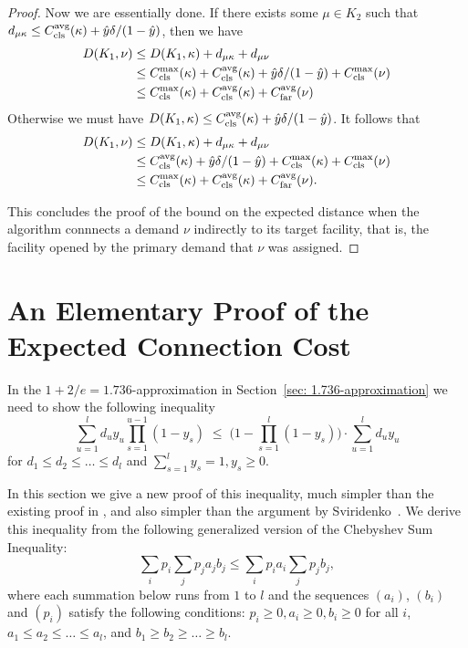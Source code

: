 \documentclass[11pt]{article}
\begin{document}
\begin{proof}
  Now we are essentially done. If there exists some $\mu \in K_2$ such
  that $d_{\mu\kappa} \leq C_{\text{cls}}^{{\mbox{\scriptsize\rm avg}}}(\kappa) +
  \hat{y}\delta/(1-\hat{y})$, then we have
  \begin{align*}
    D(K_1, \nu) &\leq D(K_1, \kappa) + d_{\mu\kappa} + d_{\mu\nu} \\
    &\leq C_{\text{cls}}^{\max}(\kappa) + C_{\text{cls}}^{{\mbox{\scriptsize\rm avg}}}(\kappa) +
    \hat{y}\delta/(1-\hat{y})
    + C_{\text{cls}}^{\max}(\nu)\\
    &\leq C_{\text{cls}}^{\max}(\kappa) + C_{\text{cls}}^{{\mbox{\scriptsize\rm avg}}}(\kappa) + C_{\text{far}}^{{\mbox{\scriptsize\rm avg}}}(\nu)
  \end{align*}
  Otherwise we must have $D(K_1, \kappa) \leq C_{\text{cls}}^{{\mbox{\scriptsize\rm avg}}}(\kappa) +
  \hat{y}\delta/(1-\hat{y})$. It follows that
  \begin{align*}
    D(K_1, \nu) &\leq D(K_1, \kappa) + d_{\mu\kappa} + d_{\mu\nu} \\
    &\leq C_{\text{cls}}^{{\mbox{\scriptsize\rm avg}}}(\kappa) + \hat{y}\delta/(1-\hat{y}) +
    C_{\text{cls}}^{\max}(\kappa)
    + C_{\text{cls}}^{\max}(\nu)\\
    &\leq C_{\text{cls}}^{\max}(\kappa) + C_{\text{cls}}^{{\mbox{\scriptsize\rm avg}}}(\kappa) + C_{\text{far}}^{{\mbox{\scriptsize\rm avg}}}(\nu).
  \end{align*}

  This concludes the proof of the bound on the expected distance when
  the algorithm connnects a demand $\nu$ indirectly to its target
  facility, that is, the facility opened by the primary demand that
  $\nu$ was assigned.
\end{proof}

\section{An Elementary Proof of the Expected Connection Cost}
In the $1+2/e=1.736$-approximation in Section~\ref{sec: 1.736-approximation}
we need to show the following inequality
%
\begin{equation}
  \label{eq:dist}
\sum_{u=1}^l d_uy_u\prod_{s=1}^{u-1}(1-y_s)
  \;\leq\;  \Big(1 - \prod_{s=1}^l (1-y_s)\Big) \cdot \sum_{u=1}^l d_u y_u
\end{equation}
%
for $d_1\leq d_2 \leq \ldots \leq d_l$ and $\sum_{s=1}^l y_s = 1, y_s \geq 0$.

In this section we give a new proof of this inequality, much
simpler than the existing proof in \cite{ChudakS04}, and also simpler than
the argument by Sviridenko~\cite{Svi02}.  
We derive this inequality from the following generalized version of the Chebyshev Sum
Inequality:
%
\begin{equation}
  \label{eq:cheby}
  \sum_{i} p_i \sum_j p_j a_j b_j \leq \sum_i p_i a_i \sum_j p_j b_j,
\end{equation}
%
where each summation below runs from $1$ to $l$ and the sequences 
$(a_i)$, $(b_i)$ and $(p_i)$ satisfy the following conditions:
$p_i\geq 0, a_i \geq 0, b_i \geq 0$ for all $i$, $a_1\leq a_2 \leq
\ldots \leq a_l$, and $b_1 \geq b_2 \geq \ldots \geq b_l$.
\end{document}

